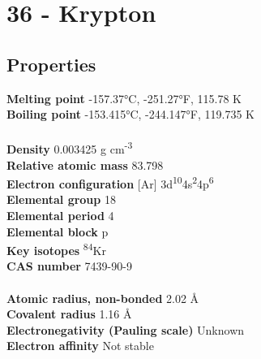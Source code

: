 \section{36 - Krypton}
\label{sec:elem-krypton}
\subsection{Properties}
\textbf{Melting point} -157.37°C, -251.27°F, 115.78 K\\
\textbf{Boiling point} -153.415°C, -244.147°F, 119.735 K\\
\\
\textbf{Density} 0.003425 g cm\textsuperscript{-3}\\
\textbf{Relative atomic mass} 83.798\\
\textbf{Electron configuration} [Ar] 3d\textsuperscript{10}4s\textsuperscript{2}4p\textsuperscript{6}\\
\textbf{Elemental group} 18\\
\textbf{Elemental period} 4\\
\textbf{Elemental block} p\\
\textbf{Key isotopes} \textsuperscript{84}Kr\\
\textbf{CAS number} 7439-90-9\\
\\
\textbf{Atomic radius, non-bonded} 2.02 Å\\
\textbf{Covalent radius} 1.16 Å\\
\textbf{Electronegativity (Pauling scale)} Unknown\\
\textbf{Electron affinity} Not stable\\
